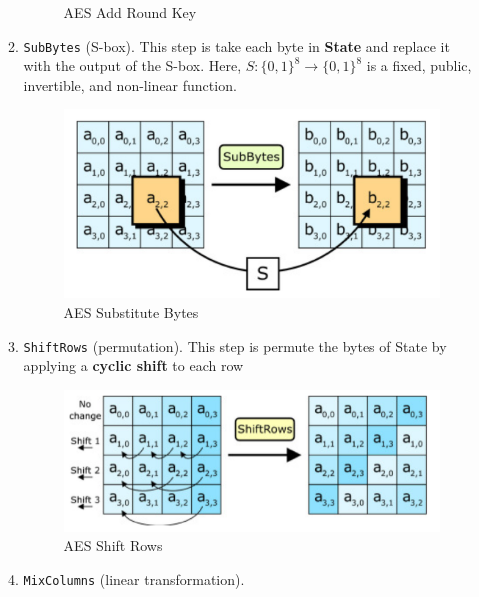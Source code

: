 \documentclass[12pt,titlepage]{article}
\begin{document}
\begin{itemize}
\begin{enumerate}
\begin{center}
\begin{figure}[h!]
		\caption{AES Add Round Key}
	\end{figure}
\end{center}
\item \texttt{SubBytes} (S-box). This step is take each byte in \textbf{State} and replace it with the output of the S-box. Here, $S : \{0, 1\}^8 \rightarrow \{0, 1\}^8$ is a fixed, public, invertible, and non-linear function.
\begin{center}
	\begin{figure}[h!]
		\includegraphics[width=\textwidth]{AES_Substitute_Bytes.png}
		\caption{AES Substitute Bytes}
	\end{figure}
\end{center}
\item \texttt{ShiftRows} (permutation). This step is permute the bytes of State by applying a \textbf{cyclic shift} to each row
\begin{center}
	\begin{figure}[h!]
		\includegraphics[width=\textwidth]{AES_Shift_Rows.png}
		\caption{AES Shift Rows}
	\end{figure}
\end{center}
\item \texttt{MixColumns} (linear transformation). 
\begin{center}
	\begin{figure}[h!]

\end{figure}
\end{center}
\end{enumerate}
\end{itemize}
\end{document}
